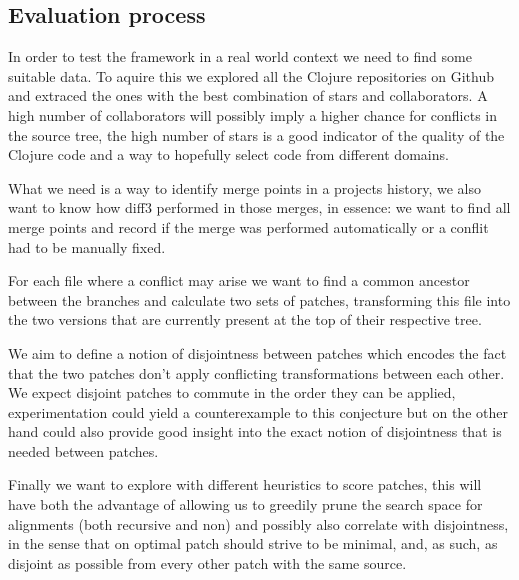 \documentclass[11pt]{article}
\begin{document}
\subsection{Evaluation process}

In order to test the framework in a real world context we need to find some suitable data. To aquire this 
we explored all the Clojure repositories on Github and extraced the ones with the best combination of 
stars and collaborators. A high number of collaborators will possibly imply a higher chance for conflicts in
the source tree, the high number of stars is a good indicator of the quality of 
the Clojure code and a way to hopefully select code from different domains.

What we need is a way to identify merge points in a projects history, we also 
want to know how diff3 performed in those merges, in essence: we want to find all 
merge points and record if the merge was performed automatically or a conflit 
had to be manually fixed.

For each file where a conflict may arise we want to find a common ancestor 
between the branches and calculate two sets of patches, transforming this file 
into the two versions that are currently present at the top of their respective 
tree. 

We aim to define a notion of disjointness between patches which 
encodes the fact that the two patches don't apply conflicting transformations 
between each other. We expect disjoint patches to commute in the order they can 
be applied, experimentation could yield a counterexample to this conjecture but 
on the other hand could also provide good insight into the exact notion of 
disjointness that is needed between patches.

Finally we want to explore with different heuristics to score patches, this will 
have both the advantage of allowing us to greedily prune the search space for 
alignments (both recursive and non) and possibly also correlate with 
disjointness, in the sense that on optimal patch should strive to be minimal, 
and, as such, as disjoint as possible from every other patch with the same source.
\end{document}
